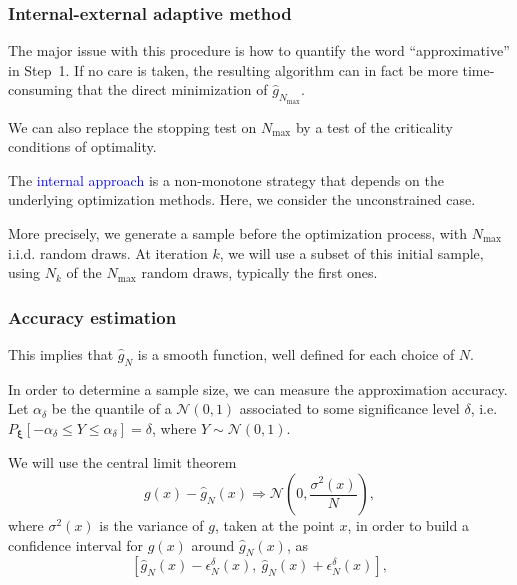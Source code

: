 \documentclass{beamer}
\def\bxi{\boldsymbol\xi}
\def\cN{\mathcal{N}}
\begin{document}
\begin{frame}
\frametitle{Internal-external adaptive method}

The major issue with this procedure is how to quantify the word ``approximative'' in Step~1.
If no care is taken, the resulting algorithm can in fact be more time-consuming that the direct minimization of $\hat{g}_{N_{\max}}$.

\mbox{}

We can also replace the stopping test on $N_{\max}$ by a test of the criticality conditions of optimality.

\mbox{}

The \textcolor{blue}{internal approach} is a non-monotone strategy that depends on the underlying optimization methods.
Here, we consider the unconstrained case.

\mbox{}

More precisely, we generate a sample before the optimization process, with $N_{\max}$ i.i.d. random draws.
At iteration $k$, we will use a subset of this initial sample, using $N_k$ of the $N_{\max}$ random draws, typically the first ones.

\end{frame}

\begin{frame}
\frametitle{Accuracy estimation}

This implies that $\hat{g}_N$ is a smooth function, well defined for each choice of $N$.


In order to determine a sample size, we can measure the approximation accuracy.
Let $\alpha_{\delta}$ be the quantile of a $\cN(0,1)$ associated to some significance level $\delta$, i.e. $P_{\bxi} [ -\alpha_{\delta} \leq Y \leq \alpha_{\delta} ] = \delta$, where $Y \sim \cN(0,1)$.

\mbox{}

We will use the central limit theorem
\[
g(x) - \hat{g}_N(x) \Rightarrow \cN \left( 0, \frac{\sigma^2(x)}{N} \right),
\]
where $\sigma^2(x)$ is the variance of $g$, taken at the point $x$, in order to build a confidence interval for $g(x)$ around $\hat{g}_N(x)$, as
\[
[\hat{g}_N(x) - \epsilon^{\delta}_N(x),\ \hat{g}_N(x) + \epsilon^{\delta}_N(x)],
\]

\end{frame}
\end{document}
